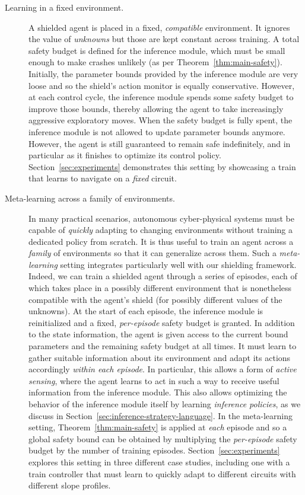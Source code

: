 \documentclass[acmsmall,screen,nonacm]{acmart}
\begin{document}
\begin{description}
  \item[Learning in a fixed environment.] \label{learning:fixed} A shielded agent is placed in a fixed, \emph{compatible} environment. It ignores the value of \emph{unknowns} but those are kept constant across training. A total safety budget is defined for the inference module, which must be small enough to make crashes unlikely (as per Theorem~\ref{thm:main-safety}). Initially, the parameter bounds provided by the inference module are very loose and so the shield's action monitor is equally conservative. However, at each control cycle, the inference module spends some safety budget to improve those bounds, thereby allowing the agent to take increasingly aggressive exploratory moves. When the safety budget is fully spent, the inference module is not allowed to update parameter bounds anymore. However, the agent is still guaranteed to remain safe indefinitely, and in particular as it finishes to optimize its control policy. Section~\ref{sec:experiments} demonstrates this setting by showcasing a train that learns to navigate on a \emph{fixed} circuit.
  
  \item[Meta-learning across a family of environments.] \label{learning:meta} In many practical scenarios, autonomous cyber-physical systems must be capable of \emph{quickly} adapting to changing environments without training a dedicated policy from scratch. It is thus useful to train an agent across a \emph{family} of environments so that it can generalize across them. Such a \emph{meta-learning} setting integrates particularly well with our shielding framework. Indeed, we can train a shielded agent through a series of episodes, each of which takes place in a possibly different environment that is nonetheless compatible with the agent's shield (for possibly different values of the unknowns). At the start of each episode, the inference module is reinitialized and a fixed, \emph{per-episode} safety budget is granted. In addition to the state information, the agent is given access to the current bound parameters and the remaining safety budget at all times. It must learn to gather suitable information about its environment and adapt its actions accordingly \emph{within each episode}. In particular, this allows a form of \emph{active sensing}, where the agent learns to act in such a way to receive useful information from the inference module. This also allows optimizing the behavior of the inference module itself by learning \emph{inference policies}, as we discuss in Section~\ref{sec:inference-strategy-language}. In the meta-learning setting, Theorem~\ref{thm:main-safety} is applied at \emph{each} episode and so a global safety bound can be obtained by multiplying the \emph{per-episode} safety budget by the number of training episodes. Section~\ref{sec:experiments} explores this setting in three different case studies, including one with a train controller that must learn to quickly adapt to different circuits with different slope profiles.
\end{description}
\end{document}

